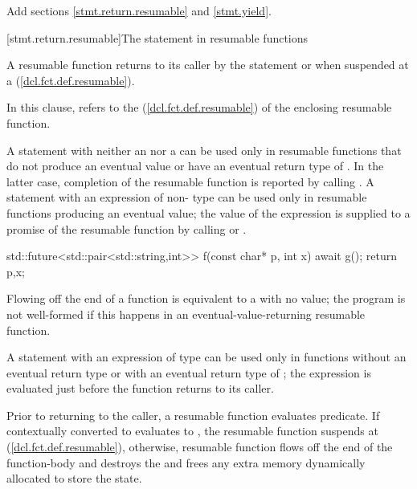 Add sections \ref{stmt.return.resumable} and \ref{stmt.yield}.

[stmt.return.resumable]{The  statement in resumable functions}%

\pnum
A resumable function returns to its caller by the  statement
or when suspended at a  (\ref{dcl.fct.def.resumable}).

\pnum
  In this clause,  refers to the   
  (\ref{dcl.fct.def.resumable})
  of the enclosing resumable function.
  
\pnum
A  statement
with neither an  nor a 
can be used only in resumable functions
that do not produce an eventual value or have an eventual return type of . In the latter case, completion of the resumable function
is reported by calling .
A  statement with an expression of non- type can be used only
in resumable functions producing an eventual value; the value of the expression is supplied to a promise of the resumable function by calling 
 or
.

\enterexample

\begin{codeblock}
  std::future<std::pair<std::string,int>> f(const char* p, int x) {
    await g();
    return {p,x};
  }
\end{codeblock}
\exitexample

Flowing off the end of a function is equivalent to a  with
no value; the program is not well-formed if this happens in an eventual-value-returning resumable function.

\pnum
A  statement with an expression of type 
can be used only in functions without an eventual return type 
or with an eventual return type of ; the expression is evaluated just before the function
returns to its caller.

\pnum
Prior to returning to the caller, a resumable function evaluates
 predicate. If  contextually converted to  evaluates to
, the resumable function suspends at  (\ref{dcl.fct.def.resumable}),
otherwise, resumable function flows off the end of the function-body and destroys the  and frees any extra memory dynamically allocated to store the state.


